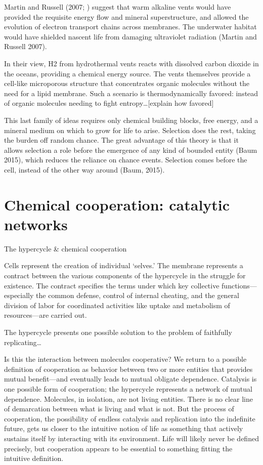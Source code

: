 \documentclass{tufte-book} %
\begin{document}
Martin and Russell (2007; ) suggest that warm alkaline vents would have provided the requisite energy flow and mineral superstructure, and allowed the evolution of electron transport chains across membranes. The underwater habitat would have shielded nascent life from damaging ultraviolet radiation (Martin and Russell 2007). 

In their view, H2 from hydrothermal vents reacts with dissolved carbon dioxide in the oceans, providing a chemical energy source. The vents themselves provide a cell-like microporous structure that concentrates organic molecules without the need for a lipid membrane. Such a scenario is thermodynamically favored: instead of organic molecules needing to fight entropy…[explain how favored]

This last family of ideas requires only chemical building blocks, free energy, and a mineral medium on which to grow for life to arise. Selection does the rest, taking the burden off random chance. The great advantage of this theory is that it allows selection a role before the emergence of any kind of bounded entity (Baum 2015), which reduces the reliance on chance events. Selection comes before the cell, instead of the other way around (Baum, 2015). 

\section{Chemical cooperation: catalytic networks}\label{chem-coop}



The hypercycle & chemical cooperation

Cells represent the creation of individual ‘selves.’ The membrane represents a contract between the various components of the hypercycle in the struggle for existence. The contract specifies the terms under which key collective functions—especially the common defense, control of internal cheating, and the general division of labor for coordinated activities like uptake and metabolism of resources—are carried out.

The hypercycle presents one possible solution to the problem of faithfully replicating…

Is this the interaction between molecules cooperative? We return to a possible definition of cooperation as behavior between two or more entities that provides mutual benefit—and eventually leads to mutual obligate dependence. Catalysis is one possible form of cooperation; the hypercycle represents a network of mutual dependence. Molecules, in isolation, are not living entities. There is no clear line of demarcation between what is living and what is not. But the process of cooperation, the possibility of endless catalysis and replication into the indefinite future, gets us closer to the intuitive notion of life as something that actively sustains itself by interacting with its environment. Life will likely never be defined precisely, but cooperation appears to be essential to something fitting the intuitive definition. 
\end{document}

